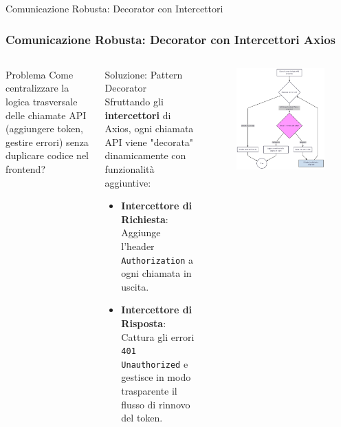 \documentclass[8pt]{beamer}
\begin{document}
\begin{frame}[fragile]{Comunicazione Robusta: Decorator con Intercettori}
  \frametitle{Comunicazione Robusta: Decorator con Intercettori Axios}
  \begin{columns}[T]
    \begin{alertblock}{Problema}
      Come centralizzare la logica trasversale delle chiamate API (aggiungere token, gestire errori) senza duplicare codice nel frontend?
    \end{alertblock}

    \begin{block}{Soluzione: Pattern Decorator}
      Sfruttando gli \textbf{intercettori} di Axios, ogni chiamata API viene "decorata" dinamicamente con funzionalità aggiuntive:
      \begin{itemize}
        \item \textbf{Intercettore di Richiesta}: Aggiunge l'header \texttt{Authorization} a ogni chiamata in uscita.
        \item \textbf{Intercettore di Risposta}: Cattura gli errori \texttt{401 Unauthorized} e gestisce in modo trasparente il flusso di rinnovo del token.
      \end{itemize}
    \end{block}

    \begin{figure}
      \includegraphics[width=\textwidth]{figures/axios_flow.png}
    \end{figure}
  \end{columns}
\end{frame}
\end{document}
